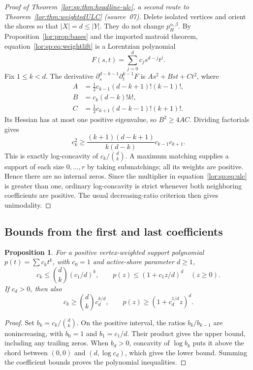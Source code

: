 \documentclass[11pt]{article}
\numberwithin{equation}{section}
\newtheorem{proposition}[theorem]{Proposition}
\theoremstyle{definition}
\begin{document}
\begin{proof}[Proof of Theorem~\ref{lor:sp:thm:headline-ulc}, a second route to Theorem~\ref{lor:thm:weightedULC} (source~07)]
Delete isolated vertices and orient the shores so that $|X|=d\le |Y|$.
They do not change $p_H^{\alpha,\beta}$. By Proposition~\ref{lor:prop:bases} and the imported
matroid theorem, equation~\eqref{lor:sp:eq:weightlift} is a Lorentzian polynomial
\[
 F(s,t)=\sum_{j=0}^{d}c_j s^{d-j}t^j.
\]
Fix $1\le k<d$. The derivative
$\partial_s^{d-k-1}\partial_t^{k-1}F$ is $As^2+Bst+Ct^2$, where
\begin{align*}
 A&=\tfrac12c_{k-1}(d-k+1)!(k-1)!,\\
 B&=c_k(d-k)!k!,\\
 C&=\tfrac12c_{k+1}(d-k-1)!(k+1)!.
\end{align*}
Its Hessian has at most one positive eigenvalue, so $B^2\ge4AC$. Dividing
factorials gives
\begin{equation}
 c_k^2\ge
 \frac{(k+1)(d-k+1)}{k(d-k)}c_{k-1}c_{k+1}.
 \label{lor:sp:eq:ulc}
\end{equation}
This is exactly log-concavity of $c_k/\binom d k$. A maximum matching supplies
a support of each size $0,\ldots,r$ by taking submatchings; all its weights
are positive. Hence there are no internal zeros. Since the multiplier in
equation~\eqref{lor:sp:eq:ulc} is greater than one, ordinary log-concavity is strict whenever
both neighboring coefficients are positive. The usual decreasing-ratio
criterion then gives unimodality.
\end{proof}

\subsection{Bounds from the first and last coefficients}
\begin{proposition}
\label{lor:sp:prop:bounds}
For a positive vertex-weighted support polynomial $p(t)=\sum c_k t^k$, with
$c_0=1$ and active-shore parameter $d\ge1$,
\begin{equation}
 c_k\le\binom d k(c_1/d)^k,
 \qquad
 p(z)\le(1+c_1z/d)^d\quad(z\ge0).
 \label{lor:sp:eq:upper}
\end{equation}
If $c_d>0$, then also
\begin{equation}
 c_k\ge\binom d k c_d^{k/d},
 \qquad
 p(z)\ge(1+c_d^{1/d}z)^d.
 \label{lor:sp:eq:lower}
\end{equation}
\end{proposition}
\begin{proof}
Set $b_k=c_k/\binom d k$. On the positive interval, the ratios $b_k/b_{k-1}$
are nonincreasing, with $b_0=1$ and $b_1=c_1/d$. Their product gives the
upper bound, including any trailing zeros. When $b_d>0$, concavity of
$\log b_k$ puts it above the chord between $(0,0)$ and $(d,\log c_d)$,
which gives the lower bound. Summing the coefficient bounds proves the
polynomial inequalities.
\end{proof}
\end{document}

